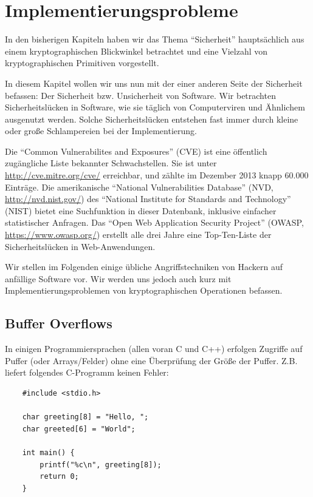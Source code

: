 
\chapter{Implementierungsprobleme}

In den bisherigen Kapiteln haben wir das Thema "`Sicherheit"' hauptsächlich aus einem kryptographischen Blickwinkel betrachtet und eine Vielzahl von kryptographischen Primitiven vorgestellt.

In diesem Kapitel wollen wir uns nun mit der einer anderen Seite der Sicherheit befassen: Der Sicherheit bzw. Unsicherheit von Software. Wir betrachten Sicherheitslücken in Software, wie sie täglich von Computerviren und Ähnlichem ausgenutzt werden. Solche Sicherheitslücken entstehen fast immer durch kleine oder große Schlampereien bei der Implementierung.

Die "`Common Vulnerabilites and Exposures"' (CVE) ist eine öffentlich zugängliche Liste bekannter Schwachstellen.
Sie ist unter \url{http://cve.mitre.org/cve/} erreichbar, und zählte im Dezember 2013 knapp 60.000 Einträge.
Die amerikanische "`National Vulnerabilities Database"' (NVD, \url{http://nvd.nist.gov/}) des "`National Institute for Standards and Technology"' (NIST) bietet eine Suchfunktion in dieser Datenbank, inklusive einfacher statistischer Anfragen.
Das "`Open Web Application Security Project"' (OWASP, \url{https://www.owasp.org/}) erstellt alle drei Jahre eine Top-Ten-Liste der Sicherheitslücken in Web-Anwendungen.

Wir stellen im Folgenden einige übliche Angriffstechniken von Hackern auf anfällige Software vor. Wir werden uns jedoch auch kurz mit Implementierungsproblemen von kryptographischen Operationen befassen.

\section{Buffer Overflows}

In einigen Programmiersprachen (allen voran C und C++) erfolgen Zugriffe auf Puffer (oder Arrays/Felder) ohne eine Überprüfung der Größe der Puffer. Z.B. liefert folgendes C-Programm keinen Fehler:


\begin{lstlisting}
	#include <stdio.h>
	
	char greeting[8] = "Hello, ";
	char greeted[6] = "World";
	
	int main() {
		printf("%c\n", greeting[8]);
		return 0;
	}
\end{lstlisting}


